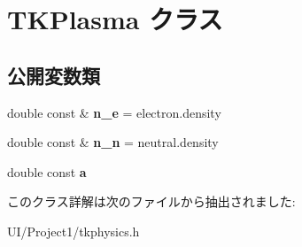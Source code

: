 \hypertarget{class_t_k_plasma}{}\section{T\+K\+Plasma クラス}
\label{class_t_k_plasma}
\subsection*{公開変数類}
\begin{DoxyCompactItemize}
\item 
\mbox{\label{class_t_k_plasma_ab2ba31fba9c3b255fa454d557b46c552}} 
double const  \& {\bfseries n\+\_\+e} = electron.\+density
\item 
\mbox{\label{class_t_k_plasma_af742f3b64a9c48f6f0e3184bf7ebb0c2}} 
double const  \& {\bfseries n\+\_\+n} = neutral.\+density
\item 
\mbox{\label{class_t_k_plasma_a0074fb0c178f69de84d5509d0bfd4ac0}} 
double const {\bfseries a}
\end{DoxyCompactItemize}


このクラス詳解は次のファイルから抽出されました\+:\begin{DoxyCompactItemize}
\item 
U\+I/\+Project1/tkphysics.\+h\end{DoxyCompactItemize}
